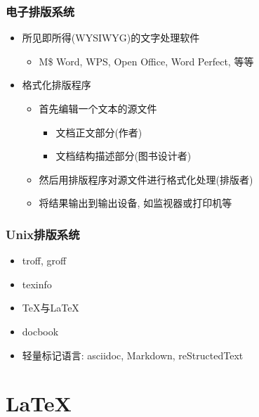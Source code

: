 \documentclass[compress]{beamer}
\begin{document}
\begin{frame}
\frametitle{电子排版系统}

\begin{itemize}
\item 所见即所得(WYSIWYG)的文字处理软件
    \begin{itemize}
    \item M\$ Word, WPS, Open Office, Word Perfect, 等等
    \end{itemize}
\item 格式化排版程序
    \begin{itemize}
    \item 首先编辑一个文本的源文件
        \begin{itemize}
          \item 文档正文部分(作者)
          \item 文档结构描述部分(图书设计者)
        \end{itemize}
    \item 然后用排版程序对源文件进行格式化处理(排版者)
    \item 将结果输出到输出设备, 如监视器或打印机等
    \end{itemize}
\end{itemize}


\end{frame}

\begin{frame}
  \frametitle{Unix排版系统}
  \begin{itemize}
    \item troff, groff
	\item texinfo
	\item \TeX{}与\LaTeX
	\item docbook
	\item 轻量标记语言: asciidoc, Markdown, reStructedText
  \end{itemize}
  
\end{frame}

\section{\LaTeX}
\end{document}
